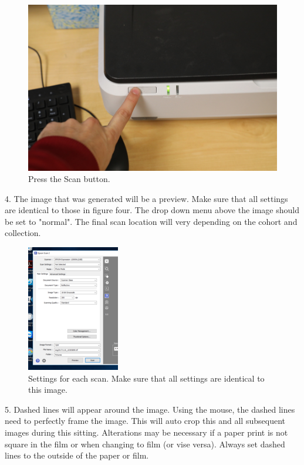 \begin{figure}[!htp]
\centering
\includegraphics[scale=0.3]{Bed_Scan}
\caption{Press the Scan button.}
\label{Image 3}
\end{figure}


\newpage

4. The image that was generated will be a preview. Make sure that all settings are identical to those in figure four. The drop down menu above the image should be set to "normal". The final scan location will very depending on the cohort and collection. 

\begin{figure}[!htp]
\centering
\includegraphics[scale=1.5]{Bed_Screen_1}
\caption{Settings for each scan. Make sure that all settings are identical to this image.}
\label{Image 4}
\end{figure}

\newpage

5. Dashed lines will appear around the image. Using the mouse, the dashed lines need to perfectly frame the image. This will auto crop this and all subsequent images during this sitting. Alterations may be necessary if a paper print is not square in the film or when changing to film (or vise versa). Always set dashed lines to the outside of the paper or film.


